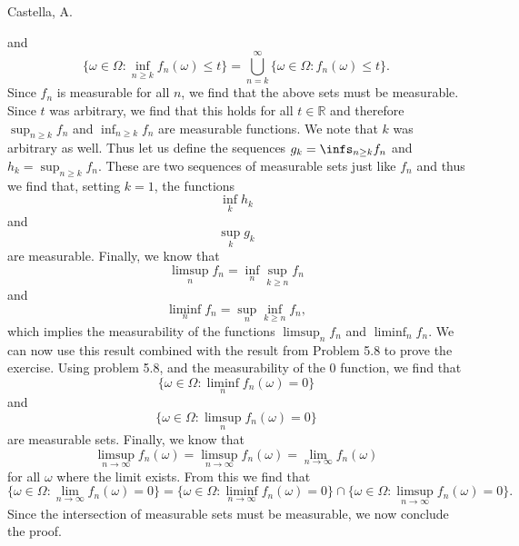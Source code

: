\begin{solution}[5.7]{Castella, A.}
\begin{itemize}
$$        $$
        and
        $$
            \{\omega \in \Omega : \inf_{n \geq k}f_n(\omega) \leq t\} = \bigcup_{n=k}^\infty \{\omega \in \Omega : f_n(\omega) \leq t\}.
        $$
        Since $f_n$ is measurable for all $n$, we find that the above sets must be measurable. Since $t$ was arbitrary, we find that this holds for all $t \in \mathbb{R}$ and therefore $\sup_{n \geq k}f_n$ and $\inf_{n \geq k}f_n$ are measurable functions. We note that $k$ was arbitrary as well. Thus let us define the sequences $g_k = \infs_{n \geq k}f_n$ and $h_k = \sup_{n \geq k}f_n$. These are two sequences of measurable sets just like $f_n$ and thus we find that, setting $k = 1$, the functions
        $$
            \inf_kh_k
        $$
        and
        $$
            \sup_kg_k
        $$
        are measurable. Finally, we know that
        $$
            \limsup_nf_n = \inf_n\sup_{k\geq n}f_n
        $$
        and
        $$
            \liminf_nf_n = \sup_n\inf_{k \geq n}f_n,
        $$
        which implies the measurability of the functions $\limsup_nf_n$ and $\liminf_nf_n$. We can now use this result combined with the result from Problem 5.8 to prove the exercise. Using problem 5.8, and the measurability of the 0 function, we find that
        $$
            \{\omega \in \Omega : \liminf_nf_n(\omega) = 0\}
        $$
        and
        $$
            \{\omega \in \Omega : \limsup_nf_n(\omega) = 0\}
        $$
        are measurable sets. Finally, we know that
        $$
            \limsup_{n\rightarrow\infty}f_n(\omega) = \limsup_{n\rightarrow\infty}f_n(\omega) = \lim_{n\rightarrow\infty}f_n(\omega)
        $$
        for all $\omega$ where the limit exists. From this we find that
        $$
            \{\omega \in \Omega : \lim_{n\rightarrow\infty}f_n(\omega) = 0\} = \{\omega \in \Omega : \liminf_{n\rightarrow\infty}f_n(\omega) = 0\}\cap\{\omega \in \Omega : \limsup_{n\rightarrow\infty}f_n(\omega) = 0\}.
        $$
        Since the intersection of measurable sets must be measurable, we now conclude the proof.
    \end{itemize}
\end{solution}

